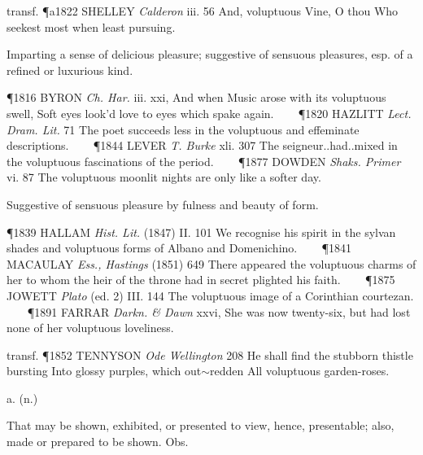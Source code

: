 \begin{description}[wide, labelwidth=!, labelindent=0pt]
\begin{myenumerate}
transf. \P a1822 SHELLEY  \textit{Calderon} iii. 56 And, voluptuous Vine, O thou Who seekest most when least pursuing.

 Imparting a sense of delicious pleasure; suggestive of sensuous pleasures, esp. of a refined or luxurious kind.

\P 1816 BYRON  \textit{Ch. Har.} iii. xxi, And when Music arose with its voluptuous swell, Soft eyes look'd love to eyes which spake again.    
\P 1820 HAZLITT  \textit{Lect. Dram. Lit.} 71 The poet succeeds less in the voluptuous and effeminate descriptions.    
\P 1844 LEVER  \textit{T. Burke} xli. 307 The seigneur..had..mixed in the voluptuous fascinations of the period.    
\P 1877 DOWDEN  \textit{Shaks. Primer} vi. 87 The voluptuous moonlit nights are only like a softer day.

 Suggestive of sensuous pleasure by fulness and beauty of form.

\P 1839 HALLAM  \textit{Hist. Lit.} (1847) II. 101 We recognise his spirit in the sylvan shades and voluptuous forms of Albano and Domenichino.    
\P 1841 MACAULAY  \textit{Ess., Hastings} (1851) 649 There appeared the voluptuous charms of her to whom the heir of the throne had in secret plighted his faith.    
\P 1875 JOWETT  \textit{Plato} (ed. 2) III. 144 The voluptuous image of a Corinthian courtezan.    
\P 1891 FARRAR  \textit{Darkn. \& Dawn} xxvi, She was now twenty-six, but had lost none of her voluptuous loveliness.

transf. \P 1852 TENNYSON  \textit{Ode Wellington} 208 He shall find the stubborn thistle bursting Into glossy purples, which out$\sim$redden All voluptuous garden-roses.
\end{myenumerate}

 a. (n.)

\noindent {}

\vspace{-0.3cm}

\begin{myenumerate}

 That may be shown, exhibited, or presented to view, hence, presentable; also, made or prepared to be shown. Obs.


\end{myenumerate}
\end{description}
